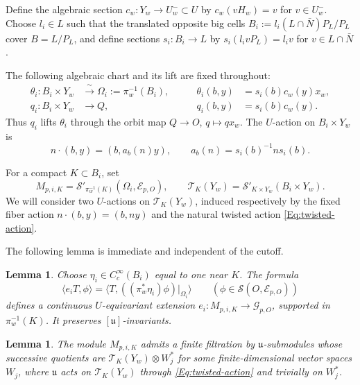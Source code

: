 \documentclass[a4paper,12pt]{amsart}
\numberwithin{equation}{section}
\theoremstyle{plain}
\newtheorem{lemma}[theorem]{Lemma}
\theoremstyle{definition}
\theoremstyle{remark}
\begin{document}
Define the algebraic section $c_w:Y_w\to U_w^-\subset U$ by $c_w(vH_w)=v$ for $v\in U_w^-$.
Choose $l_i\in L$ such that the translated opposite big cells $B_i:=l_i(L\cap\bar N)P_L/P_L$ cover $B=L/P_L$, and define sections $s_i:B_i\to L$ by $s_i(l_i vP_L)=l_i v$ for $v\in L\cap\bar N$.

The following algebraic chart and its lift are fixed throughout:
\begin{equation}\label{Eq:orbit-chart}
\begin{aligned}
\theta_i:B_i\times Y_w&\xrightarrow{\ \sim\ }\Omega_i:=\pi_w^{-1}(B_i),
&\qquad \theta_i(b,y)&=s_i(b)c_w(y)x_w,\\
q_i:B_i\times Y_w&\longrightarrow Q,
&\qquad q_i(b,y)&=s_i(b)c_w(y).
\end{aligned}
\end{equation}
Thus $q_i$ lifts $\theta_i$ through the orbit map $Q\to O$, $q\mapsto qx_w$.
The $U$-action on $B_i\times Y_w$ is
\begin{equation}\label{Eq:twisted-action}
 n\cdot(b,y)=(b,a_b(n)y),\qquad a_b(n)=s_i(b)^{-1}ns_i(b).
\end{equation}

For a compact $K\subset B_i$, set
\[
 M_{p,i,K}=\mathcal S'_{\pi_w^{-1}(K)}(\Omega_i,\mathcal E_{p,O}),
 \qquad \mathcal T_K(Y_w)=\mathcal S'_{K\times Y_w}(B_i\times Y_w).
\]
We will consider two $U$-actions on $\mathcal T_K(Y_w)$, induced respectively by the fixed fiber action $n\cdot(b,y)=(b,ny)$ and the natural twisted action \eqref{Eq:twisted-action}.

The following lemma is immediate and independent of the cutoff.

\begin{lemma}\label{L:orbit-support-extension}
Choose $\eta_i\in C_c^\infty(B_i)$ equal to one near $K$.
The formula
\begin{equation}\label{Eq:orbit-support-extension}
 \langle e_iT,\phi\rangle
 =\bigl\langle T,
       ((\pi_w^*\eta_i)\phi)|_{\Omega_i}\bigr\rangle
 \qquad(\phi\in\mathcal S(O,\mathcal E_{p,O}))
\end{equation}
defines a continuous $U$-equivariant extension $e_i:M_{p,i,K}\to\mathcal G_{p,O}$, supported in $\pi_w^{-1}(K)$.
It preserves $[\mathfrak u]$-invariants.
\end{lemma}

\begin{lemma}\label{L:normal-coefficient-filtration}
The module $M_{p,i,K}$ admits a finite filtration by $\mathfrak u$-submodules whose successive quotients are $\mathcal T_K(Y_w)\otimes W_j^*$ for some finite-dimensional vector spaces $W_j$, where $\mathfrak u$ acts on $\mathcal T_K(Y_w)$ through \eqref{Eq:twisted-action} and trivially on $W_j^*$.
\end{lemma}
\end{document}
